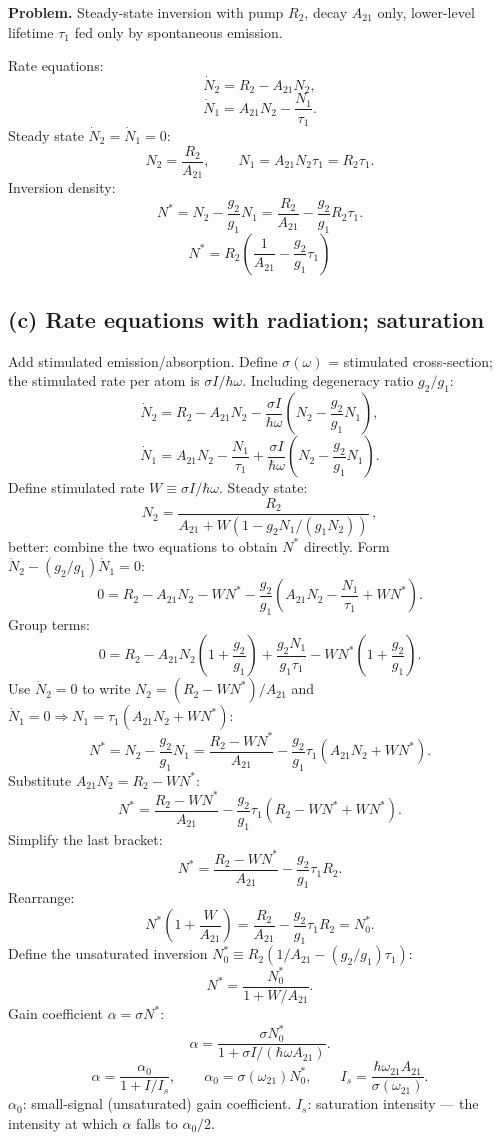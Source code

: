 \documentclass[11pt]{article}
\begin{document}
\textbf{Problem.} Steady-state inversion with pump $R_{2}$, decay $A_{21}$ only, lower-level lifetime $\tau_{1}$ fed only by spontaneous emission.

Rate equations:
\[
\dot N_{2}=R_{2}-A_{21}N_{2},
\]
\[
\dot N_{1}=A_{21}N_{2}-\frac{N_{1}}{\tau_{1}}.
\]
Steady state $\dot N_{2}=\dot N_{1}=0$:
\[
N_{2}=\frac{R_{2}}{A_{21}},\qquad N_{1}=A_{21}N_{2}\tau_{1}=R_{2}\tau_{1}.
\]
Inversion density:
\[
N^{*}=N_{2}-\frac{g_{2}}{g_{1}}N_{1}=\frac{R_{2}}{A_{21}}-\frac{g_{2}}{g_{1}}R_{2}\tau_{1}.
\]
\[
\boxed{\;N^{*}=R_{2}\!\left(\frac{1}{A_{21}}-\frac{g_{2}}{g_{1}}\tau_{1}\right)\;}
\]

\subsection*{(c) Rate equations with radiation; saturation}

Add stimulated emission/absorption. Define $\sigma(\omega)$ = stimulated cross-section; the stimulated rate per atom is $\sigma I/\hbar\omega$. Including degeneracy ratio $g_{2}/g_{1}$:
\[
\dot N_{2}=R_{2}-A_{21}N_{2}-\frac{\sigma I}{\hbar\omega}\!\left(N_{2}-\frac{g_{2}}{g_{1}}N_{1}\right),
\]
\[
\dot N_{1}=A_{21}N_{2}-\frac{N_{1}}{\tau_{1}}+\frac{\sigma I}{\hbar\omega}\!\left(N_{2}-\frac{g_{2}}{g_{1}}N_{1}\right).
\]
Define stimulated rate $W\equiv\sigma I/\hbar\omega$. Steady state:
\[
N_{2}=\frac{R_{2}}{A_{21}+W(1-g_{2}N_{1}/(g_{1}N_{2}))}\,,
\]
better: combine the two equations to obtain $N^{*}$ directly. Form $\dot N_{2}-(g_{2}/g_{1})\dot N_{1}=0$:
\[
0=R_{2}-A_{21}N_{2}-W N^{*}-\frac{g_{2}}{g_{1}}\!\left(A_{21}N_{2}-\frac{N_{1}}{\tau_{1}}+W N^{*}\right).
\]
Group terms:
\[
0=R_{2}-A_{21}N_{2}\!\left(1+\frac{g_{2}}{g_{1}}\right)+\frac{g_{2}N_{1}}{g_{1}\tau_{1}}-W N^{*}\!\left(1+\frac{g_{2}}{g_{1}}\right).
\]
Use $\dot N_{2}=0$ to write $N_{2}=(R_{2}-W N^{*})/A_{21}$ and $\dot N_{1}=0\Rightarrow N_{1}=\tau_{1}(A_{21}N_{2}+W N^{*})$:
\[
N^{*}=N_{2}-\frac{g_{2}}{g_{1}}N_{1}=\frac{R_{2}-W N^{*}}{A_{21}}-\frac{g_{2}}{g_{1}}\tau_{1}(A_{21}N_{2}+W N^{*}).
\]
Substitute $A_{21}N_{2}=R_{2}-W N^{*}$:
\[
N^{*}=\frac{R_{2}-W N^{*}}{A_{21}}-\frac{g_{2}}{g_{1}}\tau_{1}\!\left(R_{2}-W N^{*}+W N^{*}\right).
\]
Simplify the last bracket:
\[
N^{*}=\frac{R_{2}-W N^{*}}{A_{21}}-\frac{g_{2}}{g_{1}}\tau_{1}R_{2}.
\]
Rearrange:
\[
N^{*}\!\left(1+\frac{W}{A_{21}}\right)=\frac{R_{2}}{A_{21}}-\frac{g_{2}}{g_{1}}\tau_{1}R_{2}=N^{*}_{0}.
\]
Define the unsaturated inversion $N^{*}_{0}\equiv R_{2}\!\left(1/A_{21}-(g_{2}/g_{1})\tau_{1}\right)$:
\[
N^{*}=\frac{N^{*}_{0}}{1+W/A_{21}}.
\]
Gain coefficient $\alpha=\sigma N^{*}$:
\[
\alpha=\frac{\sigma N^{*}_{0}}{1+\sigma I/(\hbar\omega A_{21})}.
\]
\[
\boxed{\;\alpha=\frac{\alpha_{0}}{1+I/I_{s}},\qquad \alpha_{0}=\sigma(\omega_{21})N^{*}_{0},\qquad I_{s}=\frac{\hbar\omega_{21}A_{21}}{\sigma(\omega_{21})}.\;}
\]
$\alpha_{0}$: small-signal (unsaturated) gain coefficient. $I_{s}$: saturation intensity --- the intensity at which $\alpha$ falls to $\alpha_{0}/2$.
\end{document}
